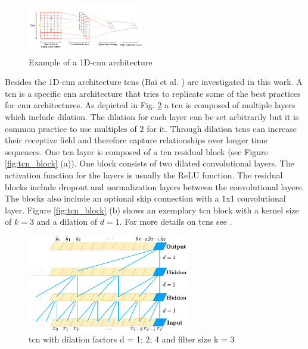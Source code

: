 \documentclass[conference]{IEEEtran}
\begin{document}
\begin{figure}[htp]
	\centering
	\includegraphics[width=0.45\textwidth]{1D_CNN_Architecture.png}
	\caption{Example of a 1D-\gls{cnn} architecture \cite{Sayyad}}
	\label{fig:1D_cnn_architecture}
\end{figure}

Besides the 1D-\gls{cnn} architecture \glspl{tcn} (Bai et al. \cite{Bai2018}) are investigated in this work. A \gls{tcn} is a specific \gls{cnn} architecture that tries to replicate some of the best practices for \gls{cnn} architectures. As depicted in Fig. \ref{fig:tcn_architecture} a \gls{tcn} is composed of multiple layers which include dilation. The dilation for each layer can be set arbitrarily but it is common practice to use multiples of $ 2 $ for it. Through dilation \glspl{tcn} can increase their receptive field and therefore capture relationships over longer time sequences. One \gls{tcn} layer is composed of a \gls{tcn} residual block (see Figure \ref{fig:tcn_block} (a)). One block consists of two dilated convolutional layers. The activation function for the layers is usually the ReLU function. The residual blocks include dropout and normalization layers between the convolutional layers. The blocks also include an optional skip connection with a 1x1 convolutional layer. Figure \ref{fig:tcn_block} (b) shows an exemplary \gls{tcn} block with a kernel size of $ k = 3 $ and a dilation of $ d = 1 $. For more details on \glspl{tcn} see \cite{Bai2018}.

\begin{figure}[htp]
	\centering
	\includegraphics[width=7cm]{tcn_architecture.pdf}
	\caption{\gls{tcn} with dilation factors d = 1; 2; 4 and filter size k = 3 \cite{Bai2018}}
	\label{fig:tcn_architecture}
\end{figure}
\end{document}
